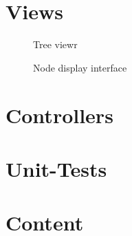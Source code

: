 \section{Views}

\begin{figure}[htbp]
\begin{center}
\caption{Tree viewr}
\label{fig:TreeView}
\end{center}
\end{figure}

\begin{figure}[htbp]
\begin{center}
\caption{Node display interface}
\label{fig:NyayaNodeDisplay}
\end{center}
\end{figure}

\section{Controllers}








\section{Unit-Tests}

\section{Content}



